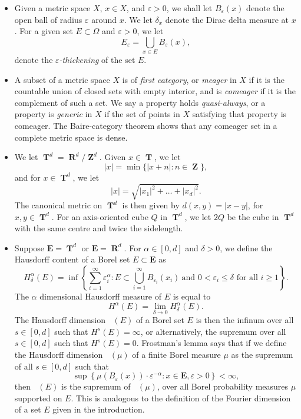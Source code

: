 \documentclass[12pt,reqno]{article}
\numberwithin{equation}{section}
\DeclareMathOperator{\hausdim}{\dim_{\mathbf{H}}}
\DeclareMathOperator{\RR}{\mathbf{R}}
\DeclareMathOperator{\ZZ}{\mathbf{Z}}
\DeclareMathOperator{\TT}{\mathbf{T}}
\numberwithin{theorem}{section}
\begin{document}
\begin{itemize}

    \item Given a metric space $X$, $x \in X$, and $\varepsilon > 0$, we shall let $B_\varepsilon(x)$ denote the open ball of radius $\varepsilon$ around $x$. We let $\delta_x$ denote the Dirac delta measure at $x$. For a given set $E \subset \Omega$ and $\varepsilon > 0$, we let
    \[ E_\varepsilon = \bigcup_{x \in E} B_\varepsilon(x), \]
    denote the \emph{$\varepsilon$-thickening} of the set $E$.

    \item A subset of a metric space $X$ is of \emph{first category}, or \emph{meager} in $X$ if it is the countable union of closed sets with empty interior, and is \emph{comeager} if it is the complement of such a set. We say a property holds \emph{quasi-always}, or a property is \emph{generic} in $X$ if the set of points in $X$ satisfying that property is comeager. The Baire-category theorem shows that any comeager set in a complete metric space is dense.

    \item We let $\TT^d = \RR^d/\ZZ^d$. Given $x \in \TT$, we let
    \[ |x| = \min \{ |x + n| : n \in \ZZ \}, \]
    and for $x \in \TT^d$, we let
    \[ |x| = \sqrt{|x_1|^2 + \dots + |x_d|^2}. \]
    The canonical metric on $\TT^d$ is then given by $d(x,y) = |x - y|$, for $x,y \in \TT^d$. For an axis-oriented cube $Q$ in $\TT^d$, we let $2Q$ be the cube in $\TT^d$ with the same centre and twice the sidelength.

    \item Suppose $\mathbf{E} = \TT^d$ or $\mathbf{E} = \RR^d$. For $\alpha \in [0,d]$ and $\delta > 0$, we define the Hausdorff content of a Borel set $E \subset \mathbf{E}$ as
    \[ H^\alpha_\delta(E) = \inf \left\{ \sum_{i = 1}^\infty \varepsilon_i^\alpha : E \subset \bigcup_{i = 1}^\infty B_{\varepsilon_i}(x_i)\ \text{and $0 < \varepsilon_i \leq \delta$ for all $i \geq 1$} \right\}. \]
    The $\alpha$ dimensional Hausdorff measure of $E$ is equal to
    \[ H^\alpha(E) = \lim_{\delta \to 0} H^\alpha_\delta(E). \]
    The Hausdorff dimension $\hausdim(E)$ of a Borel set $E$ is then the infinum over all $s \in [0,d]$ such that $H^s(E) = \infty$, or alternatively, the supremum over all $s \in [0,d]$ such that $H^s(E) = 0$. Frostman's lemma says that if we define the Hausdorff dimension $\hausdim(\mu)$ of a finite Borel measure $\mu$ as the supremum of all $s \in [0,d]$ such that
    \begin{equation} \label{hausdim}
        \sup \left\{ \mu(B_\varepsilon(x)) \cdot \varepsilon^{-\alpha} : x \in \mathbf{E}, \varepsilon > 0 \right\} < \infty,
    \end{equation}
    then $\hausdim(E)$ is the supremum of $\hausdim(\mu)$, over all Borel probability measures $\mu$ supported on $E$. This is analogous to the definition of the Fourier dimension of a set $E$ given in the introduction.


\end{itemize}
\end{document}
